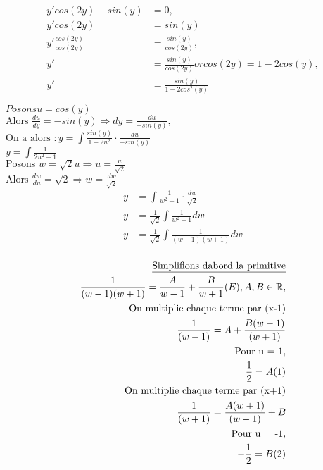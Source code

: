 \begin{align*}
	y'cos(2y) - sin(y) &= 0, \\
	y'cos(2y) &= sin(y)  \\
	y'\frac{cos(2y)}{cos(2y)} &= \frac{sin(y)}{cos(2y)} , \\
	y' &= \frac{sin(y)}{cos(2y)} or cos(2y) =  1-2cos(y) , \\
	y' &= \frac{sin(y)}{1-2cos^2(y)}  \\ \\
\end{align*}
	$ Posons u = cos(y)  $\\
	$ \text{Alors } \frac{du}{dy} = -sin(y) \Rightarrow dy = \frac{du}{-sin(y)} , $\\
	$ \text{On a alors }: y = \int \frac{sin(y)}{1-2u^2} \cdot \frac{du}{-sin(y)}  $\\
	$ y = \int\frac{1}{2u^2-1} $\\
	$ \text{Posons } w = \sqrt{2}u \Rightarrow u = \frac{w}{\sqrt{2}}  $\\
	$ \text{Alors }\frac{dw}{du} = \sqrt{2} \Rightarrow w = \frac{dw}{\sqrt{2}} $\\

\begin{align*}
	y &= \int\frac{1}{w^2-1} \cdot \frac{dw}{\sqrt{2}} \\
	y &= \frac{1}{\sqrt{2}}\int\frac{1}{w^2-1} dw \\
	y &= \frac{1}{\sqrt{2}}\int\frac{1}{(w-1)(w+1)} dw \\
\end{align*}

\begin{align*}
	\text{\underline{Simplifions dabord la primitive}} \\
	\frac{1}{(w-1)(w+1)} = \frac{A}{w-1} + \frac{B}{w+1} (E), A, B \in\mathbb{R} , \\
	\text{On multiplie chaque terme par (x-1)}  \\
	\frac{1}{(w-1)} = A + \frac{B(w-1)}{(w+1)} \\
	\text{Pour u = 1},  \\
	\frac{1}{2} = A(1) \\
	\text{On multiplie chaque terme par (x+1)}  \\
	\frac{1}{(w+1)} = \frac{A(w+1)}{(w-1)} + B \\
	\text{Pour u = -1},  \\
	-\frac{1}{2} = B(2) \\
\end{align*}

